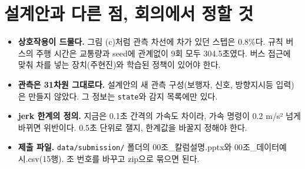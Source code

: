 \documentclass[9pt,a4paper]{extarticle}
\newcommand{\col}[1]{\texttt{#1}}
\begin{document}
\section{설계안과 다른 점, 회의에서 정할 것}
\begin{itemize}
\item \textbf{상호작용이 드물다.} 그림 (c)처럼 관측 차선에 차가 있던 스텝은 0.8\%다. 규칙 버스의 주행 시간은 교통량과 seed에 관계없이 9회 모두 304.5초였다. 버스 접근에 맞춰 차를 넣는 장치(주현진)와 학습된 정책이 있어야 한다.
\item \textbf{관측은 31차원 그대로다.} 설계안의 새 관측 구성(보행자, 신호, 방향지시등 입력)은 만들지 않았다. 그 정보는 \col{state}와 감지 목록에만 있다.
\item \textbf{jerk 한계의 정의.} 지금은 0.1초 간격의 가속도 차이라, 가속 명령이 0.2 m/s² 넘게 바뀌면 위반이다. 0.5초 단위로 잴지, 한계값을 바꿀지 정해야 한다.
\item \textbf{제출 파일.} \col{data/submission/} 폴더의 00조\_칼럼설명.pptx와 00조\_데이터예시.csv(15행). 조 번호를 바꾸고 zip으로 묶으면 된다.
\end{itemize}
\end{document}
